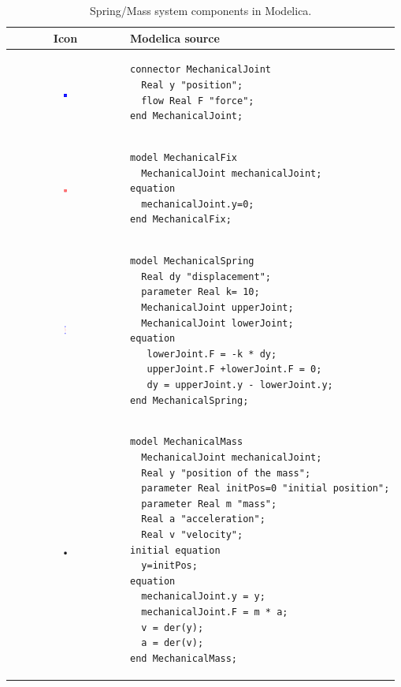 \documentclass[letterpaper, 10 pt, conference]{ieeeconf}  %
\begin{document}
\begin{table}
\begin{tabular}{cl}
Icon & Modelica source \\
\hline
\includegraphics[width=0.03\textwidth]{joint.png} & 
\begin{lstlisting}[language=modelica, backgroundcolor=\color{white}]
connector MechanicalJoint
  Real y "position";
  flow Real F "force";
end MechanicalJoint;
\end{lstlisting} \\
\hline
\includegraphics[width=0.03\textwidth]{fix.png} & 
\begin{lstlisting}[language=modelica, backgroundcolor=\color{white}]
model MechanicalFix
  MechanicalJoint mechanicalJoint;
equation 
  mechanicalJoint.y=0;
end MechanicalFix;
\end{lstlisting}\\
\hline
\includegraphics[width=0.03\textwidth]{spring.png} & 
\begin{lstlisting}[language=modelica, backgroundcolor=\color{white}]
model MechanicalSpring
  Real dy "displacement";
  parameter Real k= 10;
  MechanicalJoint upperJoint;
  MechanicalJoint lowerJoint;
equation 
   lowerJoint.F = -k * dy;
   upperJoint.F +lowerJoint.F = 0;
   dy = upperJoint.y - lowerJoint.y;
end MechanicalSpring;
\end{lstlisting}\\
\hline
\includegraphics[width=0.03\textwidth]{mass.png} & 
\begin{lstlisting}[language=modelica, backgroundcolor=\color{white}]
model MechanicalMass
  MechanicalJoint mechanicalJoint;
  Real y "position of the mass";
  parameter Real initPos=0 "initial position";
  parameter Real m "mass";
  Real a "acceleration";
  Real v "velocity";
initial equation 
  y=initPos;
equation 
  mechanicalJoint.y = y;
  mechanicalJoint.F = m * a;
  v = der(y);
  a = der(v);
end MechanicalMass; 
\end{lstlisting}
\end{tabular}
\caption{Spring/Mass system components in Modelica.}
\label{spring}
\end{table}
\end{document}
